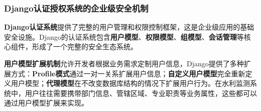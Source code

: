 \begin{Shaded}
\begin{Highlighting}[]
\OperatorTok{=}
\OperatorTok{=}
\OperatorTok{=}\NormalTok{)}
\OperatorTok{=}\OperatorTok{=}\OperatorTok{=}\NormalTok{)}
\OperatorTok{=}\OperatorTok{=}\NormalTok{)}
\OperatorTok{=}
\OperatorTok{=}\OperatorTok{=}\OperatorTok{=}\NormalTok{)}
\OperatorTok{=}\OperatorTok{=}\NormalTok{, }
\OperatorTok{=}\NormalTok{[(}\NormalTok{, }\NormalTok{), }
\NormalTok{                                    (}\NormalTok{, }\NormalTok{),}
\NormalTok{                                    (}\NormalTok{, }\NormalTok{)])}
\end{Highlighting}
\end{Shaded}

\subsubsection{Django认证授权系统的企业级安全机制}\label{djangoux8ba4ux8bc1ux6388ux6743ux7cfbux7edfux7684ux4f01ux4e1aux7ea7ux5b89ux5168ux673aux5236}

\textbf{Django认证系统}提供了完整的用户管理和权限控制框架，这是企业级应用的基础安全设施。Django的认证系统包含\textbf{用户模型}、\textbf{权限模型}、\textbf{组模型}、\textbf{会话管理}等核心组件，形成了一个完整的安全生态系统。

\textbf{用户模型扩展机制}允许开发者根据业务需求定制用户信息，Django提供了多种扩展方式：\textbf{Profile模式}通过一对一关系扩展用户信息；\textbf{自定义用户模型}完全重新定义用户模型；\textbf{代理模型}在不改变数据库结构的情况下扩展用户行为。在水利监测系统中，用户往往需要携带部门信息、管辖区域、专业职责等业务属性，这些都可以通过用户模型扩展来实现。

